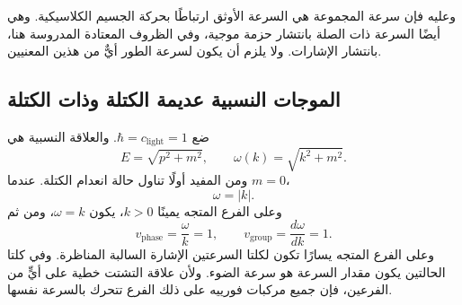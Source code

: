 \begin{classroomqa}
\end{classroomqa}

وعليه فإن سرعة المجموعة هي السرعة الأوثق ارتباطًا بحركة الجسيم الكلاسيكية. وهي أيضًا السرعة ذات الصلة بانتشار حزمة موجية، وفي الظروف المعتادة المدروسة هنا، بانتشار الإشارات. ولا يلزم أن يكون لسرعة الطور أيٌّ من هذين المعنيين.

\subsection{الموجات النسبية عديمة الكتلة وذات الكتلة}

\begin{classroomqa}
\end{classroomqa}

\begin{classroomqa}
\end{classroomqa}

ضع \(\hbar=c_{\mathrm{light}}=1\). والعلاقة النسبية هي
\begin{equation}
E=\sqrt{p^2+m^2},
\qquad
\omega(k)=\sqrt{k^2+m^2}.
\end{equation}
ومن المفيد أولًا تناول حالة انعدام الكتلة. عندما \(m=0\)،
\begin{equation}
\omega=|k|.
\end{equation}
وعلى الفرع المتجه يمينًا \(k>0\)، يكون \(\omega=k\)، ومن ثم
\begin{equation}
v_{\mathrm{phase}}=\frac{\omega}{k}=1,
\qquad
v_{\mathrm{group}}=\frac{d\omega}{dk}=1.
\end{equation}
وعلى الفرع المتجه يسارًا تكون لكلتا السرعتين الإشارة السالبة المناظرة. وفي كلتا الحالتين يكون مقدار السرعة هو سرعة الضوء. ولأن علاقة التشتت خطية على أيٍّ من الفرعين، فإن جميع مركبات فورييه على ذلك الفرع تتحرك بالسرعة نفسها.

